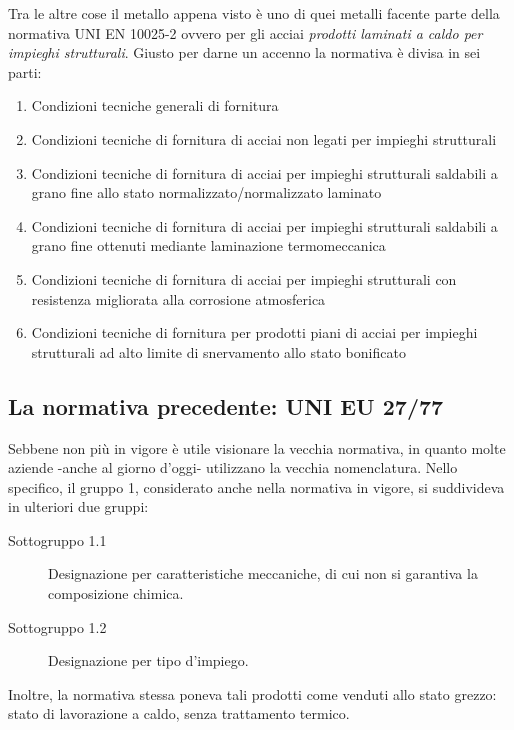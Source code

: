 Tra le altre cose il metallo appena visto è uno di quei metalli facente parte della normativa UNI EN 10025-2 ovvero per gli acciai \textit{prodotti laminati a caldo per impieghi strutturali}. Giusto per darne un accenno la normativa è divisa in sei parti:
\begin{enumerate}
\item Condizioni tecniche generali di fornitura
\item Condizioni tecniche di fornitura di acciai non legati per impieghi strutturali
\item Condizioni tecniche di fornitura di acciai per impieghi strutturali saldabili a grano fine allo stato normalizzato/normalizzato laminato
\item Condizioni tecniche di fornitura di acciai per impieghi strutturali saldabili a grano fine ottenuti mediante laminazione termomeccanica
\item Condizioni tecniche di fornitura di acciai per impieghi strutturali con resistenza migliorata alla corrosione atmosferica
\item Condizioni tecniche di fornitura per prodotti piani di acciai per impieghi strutturali ad alto limite di snervamento allo stato bonificato
\end{enumerate}

\subsection*{La normativa precedente: UNI EU 27/77}
Sebbene non più in vigore è utile visionare la vecchia normativa, in quanto molte aziende -anche al giorno d'oggi- utilizzano la vecchia nomenclatura.
Nello specifico, il gruppo 1, considerato anche nella normativa in vigore, si suddivideva in ulteriori due gruppi:
\begin{description}
\item[Sottogruppo 1.1] Designazione per caratteristiche meccaniche, di cui non si garantiva la composizione chimica.
\item[Sottogruppo 1.2] Designazione per tipo d'impiego. 
\end{description}
Inoltre, la normativa stessa poneva tali prodotti come venduti allo stato grezzo: stato di lavorazione a caldo, senza trattamento termico.

